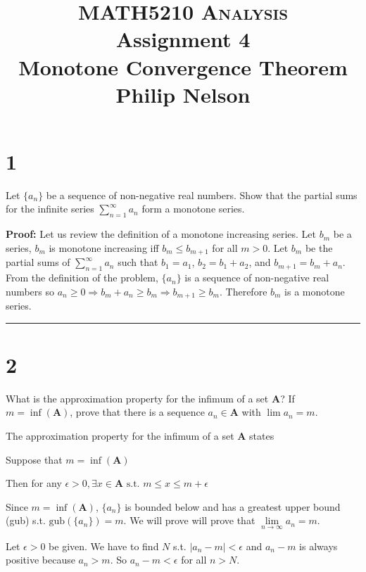 \documentclass[10pt,letterpaper]{article}
\newcommand\A{\mathbf{A}}
\newcommand\ds{\displaystyle}
\newcommand\qedsym{\hfill \rule{2mm}{2mm}}
\begin{document}
\title{MATH5210 \textsc{Analysis}
  \\ Assignment 4
  \\ Monotone Convergence Theorem
  \\ Philip Nelson
}

\date{}

\maketitle

\section*{1} Let $\{a_n\}$ be a sequence of non-negative real numbers. Show that the partial sums for the infinite series $\ds \sum_{n=1}^{\infty } a_n$ form a monotone series.

\textbf{Proof:} Let us review the definition of a monotone increasing series. Let $b_m$ be a series, $b_m$ is monotone increasing iff $b_m \leq b_{m+1}$ for all $m > 0$. Let $b_m$ be the partial sums of $\ds \sum_{n=1}^{\infty } a_n$ such that $b_1 = a_1$, $b_2 = b_1 + a_2$, and $b_{m+1} = b_m + a_n$. From the definition of the problem, $\{a_n\}$ is a sequence of non-negative real numbers so $a_n \geq 0 \Rightarrow b_m + a_n \geq b_m \Rightarrow b_{m+1} \geq b_m$. Therefore $b_m$ is a monotone series. \qedsym{}
\section*{2} What is the approximation property for the infimum of a set $\A$? If $m = \inf(\A)$, prove that there is a sequence $a_n \in \A$ with $\lim a_n = m$.

\bigskip

The approximation property for the infimum of a set $\A$ states

Suppose that $m = \inf(\A)$

Then for any $\epsilon > 0, \exists x \in \A \text{ s.t. }  m \leq x \leq m + \epsilon$

\bigskip

Since $m = \inf(\A)$, $\{a_n\}$ is bounded below and has a greatest upper bound (gub) s.t. $\text{gub}(\{a_n\}) = m$.
We will prove will prove that $\lim\limits_{n \to \infty} a_n = m$.

Let $\epsilon > 0$ be given. We have to find $N$ s.t. $| a_n - m | < \epsilon$ and $a_n - m$ is always positive because $a_n > m$. So $a_n - m < \epsilon$ for all $n > N$.
\end{document}
